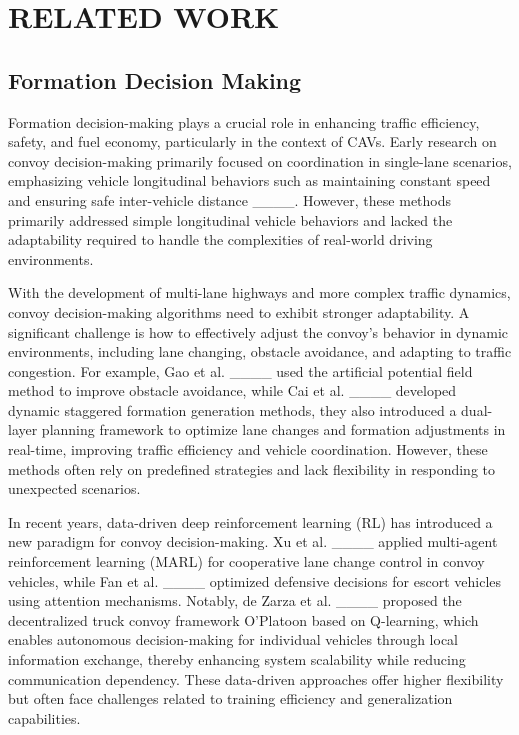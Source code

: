 \section{RELATED WORK}
\subsection{Formation Decision Making} Formation decision-making plays a crucial role in enhancing traffic efficiency, safety, and fuel economy, particularly in the context of CAVs. Early research on convoy decision-making primarily focused on coordination in single-lane scenarios, emphasizing vehicle longitudinal behaviors such as maintaining constant speed and ensuring safe inter-vehicle distance ____. However, these methods primarily addressed simple longitudinal vehicle behaviors and lacked the adaptability required to handle the complexities of real-world driving environments.

With the development of multi-lane highways and more complex traffic dynamics, convoy decision-making algorithms need to exhibit stronger adaptability. A significant challenge is how to effectively adjust the convoy's behavior in dynamic environments, including lane changing, obstacle avoidance, and adapting to traffic congestion. For example, Gao et al. ____ used the artificial potential field method to improve obstacle avoidance, while Cai et al. ____ developed dynamic staggered formation generation methods, they also introduced a dual-layer planning framework to optimize lane changes and formation adjustments in real-time, improving traffic efficiency and vehicle coordination. However, these methods often rely on predefined strategies and lack flexibility in responding to unexpected scenarios.

In recent years, data-driven deep reinforcement learning (RL) has introduced a new paradigm for convoy decision-making. Xu et al. ____ applied multi-agent reinforcement learning (MARL) for cooperative lane change control in convoy vehicles, while Fan et al. ____ optimized defensive decisions for escort vehicles using attention mechanisms. Notably, de Zarza et al. ____ proposed the decentralized truck convoy framework O'Platoon based on Q-learning, which enables autonomous decision-making for individual vehicles through local information exchange, thereby enhancing system scalability while reducing communication dependency. These data-driven approaches offer higher flexibility but often face challenges related to training efficiency and generalization capabilities.

